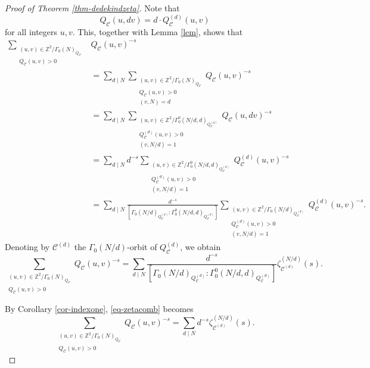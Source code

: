 \documentclass[12pt]{amsart}
\numberwithin{equation}{section}
\theoremstyle{definition}
\begin{document}
\begin{proof}[Proof of Theorem \ref{thm-dedekindzeta}]
Note that
$$Q_{\mathcal{C}}(u,dv)=d\cdot Q_{\mathcal{C}}^{(d)}(u,v)$$
for all integers $u,v$. This, together with Lemma \ref{lem}, shows that
\begin{align*}
    \sum\limits_{\substack{(u,v)\in\mathbb{Z}^{2}/\Gamma_{0}(N)_{Q_{\mathcal{C}}} \\ Q_{\mathcal{C}}(u,v)>0}}&Q_{\mathcal{C}}(u,v)^{-s}\\
    &=\sum_{d\mid N}\sum\limits_{\substack{(u,v)\in\mathbb{Z}^{2}/\Gamma_{0}(N)_{Q_{\mathcal{C}}} \\ Q_{\mathcal{C}}(u,v)>0 \\ (v,N)=d}}Q_{\mathcal{C}}(u,v)^{-s}\\
    &=\sum_{d\mid N}\sum\limits_{\substack{(u,v)\in\mathbb{Z}^{2}/\Gamma_{0}^{0}(N/d,d)_{Q_{\mathcal{C}}^{(d)}} \\ Q_{\mathcal{C}}^{(d)}(u,v)>0 \\ (v,N/d)=1}}Q_{\mathcal{C}}(u,dv)^{-s}\\
    &=\sum_{d\mid N}d^{-s}\sum\limits_{\substack{(u,v)\in\mathbb{Z}^{2}/\Gamma_{0}^{0}(N/d,d)_{Q_{\mathcal{C}}^{(d)}} \\ Q_{\mathcal{C}}^{(d)}(u,v)>0 \\ (v,N/d)=1}}Q_{\mathcal{C}}^{(d)}(u,v)^{-s}\\
    &=\sum_{d\mid N}\frac{d^{-s}}{[\Gamma_{0}(N/d)_{Q_{\mathcal{C}}^{(d)}}:\Gamma_{0}^{0}(N/d,d)_{Q_{\mathcal{C}}^{(d)}}]}\sum\limits_{\substack{(u,v)\in\mathbb{Z}^{2}/\Gamma_{0}(N/d)_{Q_{\mathcal{C}}^{(d)}} \\ Q_{\mathcal{C}}^{(d)}(u,v)>0 \\ (v,N/d)=1}}Q_{\mathcal{C}}^{(d)}(u,v)^{-s}.
\end{align*}
Denoting by $\mathcal{C}^{(d)}$ the $\Gamma_{0}(N/d)$-orbit of $Q_{\mathcal{C}}^{(d)}$, we obtain
\begin{equation}\label{eq-zetacomb}
    \sum\limits_{\substack{(u,v)\in\mathbb{Z}^{2}/\Gamma_{0}(N)_{Q_{\mathcal{C}}} \\ Q_{\mathcal{C}}(u,v)>0}}Q_{\mathcal{C}}(u,v)^{-s}
    =\sum_{d\mid N}\frac{d^{-s}}{[\Gamma_{0}(N/d)_{Q_{\mathcal{C}}^{(d)}}:\Gamma_{0}^{0}(N/d,d)_{Q_{\mathcal{C}}^{(d)}}]}\zeta_{\mathcal{C}^{(d)}}^{(N/d)}(s).
\end{equation}

By Corollary \ref{cor-indexone}, \eqref{eq-zetacomb} becomes
\begin{equation}\label{eq-indexremoved}
    \sum\limits_{\substack{(u,v)\in\mathbb{Z}^{2}/\Gamma_{0}(N)_{Q_{\mathcal{C}}} \\ Q_{\mathcal{C}}(u,v)>0}}Q_{\mathcal{C}}(u,v)^{-s}
    =\sum_{d\mid N}d^{-s}\zeta_{\mathcal{C}^{(d)}}^{(N/d)}(s).
\end{equation}


\end{proof}
\end{document}

